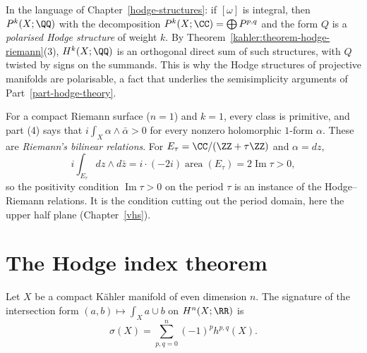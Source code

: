 \begin{remark}\label{kahler:remark-polarisation}
In the language of Chapter~\ref{hodge-structures}: if $[\omega]$ is integral, then $P^k(X; \QQ)$ with the decomposition
$P^k(X; \CC) = \bigoplus P^{p,q}$ and the form $Q$ is a \emph{polarised Hodge structure} of weight $k$. By
Theorem~\ref{kahler:theorem-hodge-riemann}(3), $H^k(X; \QQ)$ is an orthogonal direct sum of such structures, with $Q$ twisted by
signs on the summands. This is why the Hodge structures of projective manifolds are polarisable, a fact that underlies the semisimplicity
arguments of Part~\ref{part-hodge-theory}.
\end{remark}

\begin{example}\label{kahler:example-curves-riemann}
For a compact Riemann surface ($n = 1$) and $k = 1$, every class is primitive, and part (4) says that $i\int_X\alpha \wedge \bar\alpha > 0$ for
every nonzero holomorphic $1$-form $\alpha$. These are \emph{Riemann's bilinear relations}. For $E_\tau = \CC/(\ZZ + \tau\ZZ)$ and $\alpha = dz$,
\[
i\int_{E_\tau}dz \wedge d\bar z = i\cdot(-2i)\operatorname{area}(E_\tau) = 2\operatorname{Im}\tau > 0,
\]
so the positivity condition $\operatorname{Im}\tau > 0$ on the period $\tau$ is an instance of the Hodge--Riemann relations. It is the
condition cutting out the period domain, here the upper half plane (Chapter~\ref{vhs}).
\end{example}

\section{The Hodge index theorem}\label{kahler:section-hodge-index}

\begin{theorem}\label{kahler:theorem-hodge-index}
Let $X$ be a compact K\"ahler manifold of even dimension $n$. The signature of the intersection form $(a, b) \mapsto \int_Xa \cup b$ on
$H^n(X; \RR)$ is
\[
\sigma(X) = \sum_{p,q = 0}^n(-1)^ph^{p,q}(X).
\]
\end{theorem}

